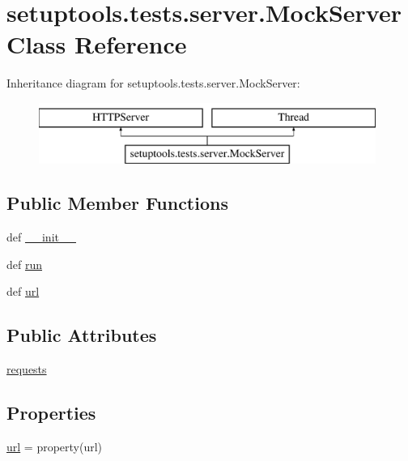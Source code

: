\hypertarget{classsetuptools_1_1tests_1_1server_1_1MockServer}{}\section{setuptools.\+tests.\+server.\+Mock\+Server Class Reference}
\label{classsetuptools_1_1tests_1_1server_1_1MockServer}
Inheritance diagram for setuptools.\+tests.\+server.\+Mock\+Server\+:\begin{figure}[H]
\begin{center}
\leavevmode
\includegraphics[height=2.000000cm]{classsetuptools_1_1tests_1_1server_1_1MockServer}
\end{center}
\end{figure}
\subsection*{Public Member Functions}
\begin{DoxyCompactItemize}
\item 
def \hyperlink{classsetuptools_1_1tests_1_1server_1_1MockServer_a2d3646abfbf1584798afe0586e07ea12}{\+\_\+\+\_\+init\+\_\+\+\_\+}
\item 
def \hyperlink{classsetuptools_1_1tests_1_1server_1_1MockServer_ad218852d53678695b45a700e4621b35b}{run}
\item 
def \hyperlink{classsetuptools_1_1tests_1_1server_1_1MockServer_a50539d9aa0c64b6d7499802ecdc78426}{url}
\end{DoxyCompactItemize}
\subsection*{Public Attributes}
\begin{DoxyCompactItemize}
\item 
\hyperlink{classsetuptools_1_1tests_1_1server_1_1MockServer_a1477be33b73cdd15e463f4a8108d9cf0}{requests}
\end{DoxyCompactItemize}
\subsection*{Properties}
\begin{DoxyCompactItemize}
\item 
\hyperlink{classsetuptools_1_1tests_1_1server_1_1MockServer_adf00becadeb94847365021720d588424}{url} = property(url)
\end{DoxyCompactItemize}


